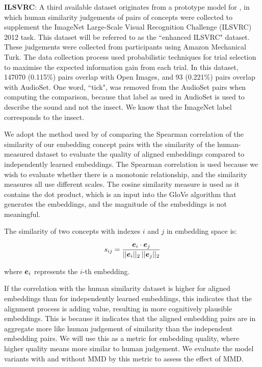 \textbf{ILSVRC}: A third available dataset originates from a prototype model for \cite{RoadsLoveCVPR}, in which human similarity judgements of pairs of concepts were collected to supplement the ImageNet Large-Scale Visual Recognition Challenge (ILSVRC) 2012 task. This dataset will be referred to as the ``enhanced ILSVRC" dataset. These judgements were collected from participants using Amazon Mechanical Turk. The data collection process used probabilistic techniques for trial selection to maximise the expected information gain from each trial. In this dataset, 147070 (0.115\%) pairs overlap with Open Images, and 93 (0.221\%) pairs overlap with AudioSet. One word, ``tick", was removed from the AudioSet pairs when computing the comparison, because that label as used in AudioSet is used to describe the sound and not the insect. We know that the ImageNet label corresponds to the insect. 

We adopt the method used by \cite{mturk771} of comparing the Spearman correlation of the similarity of our embedding concept pairs with the similarity of the human-measured dataset to evaluate the quality of aligned embeddings compared to independently learned embeddings. The Spearman correlation is used because we wish to evaluate whether there is a monotonic relationship, and the similarity measures all use different scales. The cosine similarity measure is used as it contains the dot product, which is an input into the GloVe algorithm that generates the embeddings, and the magnitude of the embeddings is not meaningful. 

The similarity of two concepts with indexes $i$ and $j$ in embedding space is:

\begin{equation*}
s_{ij} = \frac{\boldsymbol{e}_i \cdot \boldsymbol{e}_j}{||\boldsymbol{e}_i||_2 \medspace ||\boldsymbol{e}_j||_2}
\end{equation*}

where $\boldsymbol{e}_i$ represents the $i$-th embedding.

If the correlation with the human similarity dataset is higher for aligned embeddings than for independently learned embeddings, this indicates that the alignment process is adding value, resulting in more cognitively plausible embeddings. This is because it indicates that the aligned embedding pairs are in aggregate more like human judgement of similarity than the independent embedding pairs. We will use this as a metric for embedding quality, where higher quality means more similar to human judgement.  We evaluate the model variants with and without MMD by this metric to assess the effect of MMD. 

